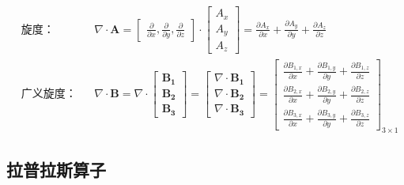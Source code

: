 \documentclass[UTF8]{report}
\theoremstyle{MyLineTheoremStyle} %
\theoremstyle{MyBlockTheoremStyle} %
\theoremstyle{MySubsubsectionStyle} %
\begin{document}
\begin{equation}
\begin{aligned}
    &\text{旋度：}
    &&\nabla \cdot \boldsymbol{A} 
    =
    \begin{bmatrix}
        \frac{\partial  }{\partial x }, \frac{\partial  }{\partial y }, \frac{\partial  }{\partial z }
    \end{bmatrix}
    \cdot 
    \begin{bmatrix}
        A_x \\ A_y \\ A_z
    \end{bmatrix} 
    = 
    \frac{\partial A_x }{\partial x } +\frac{\partial A_y }{\partial y } + \frac{\partial A_z }{\partial z }
    \\ 
    &\text{广义旋度：}
    &&\nabla \cdot \boldsymbol{B} = 
    \nabla \cdot 
    \begin{bmatrix}
        \boldsymbol{B_1} \\ \boldsymbol{B_2} \\ \boldsymbol{B_3}
    \end{bmatrix} = 
    \begin{bmatrix}
        \nabla \cdot \boldsymbol{B_1} \\ \nabla \cdot \boldsymbol{B_2} \\ \nabla \cdot \boldsymbol{B_3}
    \end{bmatrix} = 
    \begin{bmatrix}
        \frac{\partial B_{1,x} }{\partial x } +\frac{\partial B_{1,y} }{\partial y } + \frac{\partial B_{1,z} }{\partial z } \\
        \frac{\partial B_{2,x} }{\partial x } +\frac{\partial B_{2,y} }{\partial y } + \frac{\partial B_{2,z} }{\partial z } \\
        \frac{\partial B_{3,x} }{\partial x } +\frac{\partial B_{3,y} }{\partial y } + \frac{\partial B_{3,z} }{\partial z }
    \end{bmatrix}_{3\times 1}
\end{aligned}
\end{equation}

\subsection{拉普拉斯算子}
\end{document}
